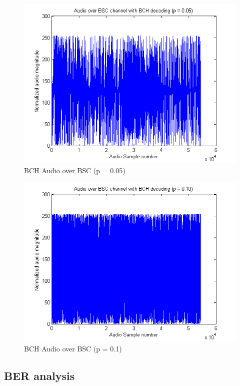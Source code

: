 \documentclass[a4paper]{article}
\begin{document}
\begin{figure}[hbtp]
\centering
\includegraphics[scale=0.5]{plots/audio_over_bsc_bch_p_005.png}
\caption{BCH Audio over BSC (p = 0.05)}
\end{figure}

\begin{figure}[hbtp]
\centering
\includegraphics[scale=0.5]{plots/audio_over_bsc_bch_p_010.png}
\caption{BCH Audio over BSC (p = 0.1)}
\end{figure}

\subsection{BER analysis}
\end{document}
